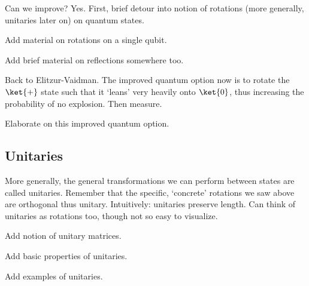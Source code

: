 Can we improve? Yes. First, brief detour into notion of rotations (more generally, unitaries later on) on quantum states.

\begin{definition}
    Add material on rotations on a single qubit.
\end{definition}

Add brief material on reflections somewhere too.

Back to Elitzur-Vaidman. The improved quantum option now is to rotate the $\ket{+}$ state such that it `leans' very heavily onto $\ket{0}$, thus increasing the probability of no explosion. Then measure.

Elaborate on this improved quantum option.

\subsection{Unitaries}
More generally, the general transformations we can perform between states are called unitaries. Remember that the specific, `concrete' rotations we saw above are orthogonal thus unitary. Intuitively: unitaries preserve length. Can think of unitaries as rotations too, though not so easy to visualize.


\begin{definition}
    Add notion of unitary matrices.
\end{definition}


    Add basic properties of unitaries.


\begin{example}
    Add examples of unitaries.
\end{example}




% 
% 
% 

